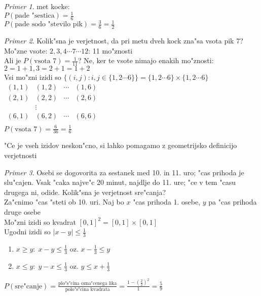 \documentclass[a4paper,12pt]{article}
\theoremstyle{definition}
\theoremstyle{remark}
\newtheorem*{ex}{Primer}
\begin{document}
\begin{ex}
    met kocke: \\
    $P(\text{pade "sestica}) = \frac{1}{6}$ \\
    $P(\text{pade sodo "stevilo pik}) = \frac{3}{6} = \frac{1}{2}$
\end{ex}

\begin{ex}
    Kolik"sna je verjetnost, da pri metu dveh kock zna"sa vsota pik 7? \\
    Mo"zne vsote: $2, 3, 4 \cdots 7 \cdots 12$: 11 mo"znosti \\
    Ali je $P(\text{vsota 7}) = \frac{1}{11}$? Ne, ker te vsote nimajo enakih mo"znosti: \\
    $2=1+1, 3=2+1=1+2$ \\
    Vsi mo"zni izidi so $\{(i,j): i,j \in \{1, 2 \cdots 6\}\} = \{1, 2 \cdots 6\} \times \{1, 2 \cdots 6\}$ \\
    $\begin{matrix}
        (1,1) & (1,2) & \cdots & (1,6) \\
        (2,1) & (2,2) & \cdots & (2,6) \\
         & \vdots & & \\
        (6,1) & (6,2) & \cdots & (6,6) \\
    \end{matrix}$ \\
    $P(\text{vsota 7}) = \frac{6}{36} = \frac{1}{6}$
\end{ex}

"Ce je vseh izidov neskon"cno, si lahko pomagamo z geometrijsko definicijo verjetnosti

\begin{ex}
    Osebi se dogovorita za sestanek med 10. in 11. uro; "cas prihoda je slu"cajen. Vsak "caka najve"c 20 minut, najdlje
    do 11. ure; "ce v tem "casu drugega ni, odide. Kolik"sna je verjetnost sre"canja? \\
    Za"cnimo "cas "steti ob 10. uri. Naj bo $x$ "cas prihoda 1. osebe, $y$ pa "cas prihoda druge osebe \\
    Mo"zni izidi so kvadrat $[0,1]^2 = [0,1] \times [0,1]$ \\
    Ugodni izidi so $|x-y| \leq \frac{1}{3}$
    \begin{enumerate}
        \item $x \geq y: \; x - y \leq \frac{1}{3}$ oz. $x - \frac{1}{3} \leq y$
        \item $x \leq y: \; y - x \leq \frac{1}{3}$ oz. $y \leq x + \frac{1}{3}$
    \end{enumerate}
    $P(\text{sre"canje}) = \frac{\text{plo"s"cina ozna"cenega lika}}{\text{polo"s"cina kvadrata}} =
    \frac{1 - (\frac{2}{3})^2}{1} = \frac{5}{9}$
\end{ex}
\end{document}
